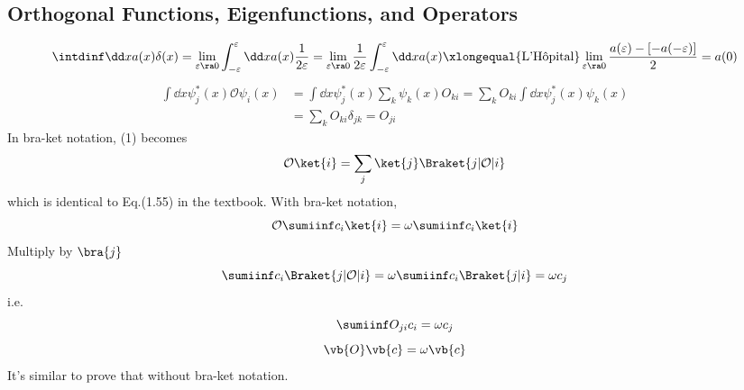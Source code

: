 \documentclass[a4paper]{article}
\begin{document}
\subsection{Orthogonal Functions, Eigenfunctions, and Operators}
\begin{equation}\label{key}
\intdinf \dd x a(x)\delta(x) = \lim_{\varepsilon\ra 0} \int_{-\varepsilon}^\varepsilon \dd x a(x)\dfrac{1}{2\varepsilon} = \lim_{\varepsilon\ra 0} \dfrac{1}{2\varepsilon} \int_{-\varepsilon}^\varepsilon \dd x a(x) 
\xlongequal{\text{L'H\^opital}} \lim_{\varepsilon\ra 0} \dfrac{a(\varepsilon) - [-a(-\varepsilon)]}{2} = a(0)
\end{equation}
\begin{equation}\label{key}
\begin{aligned}
\int \dd x \psi_j^*(x)\mathcal{O}\psi_i(x) &= \int\dd x \psi_j^*(x)\sum_k\psi_k(x)O_{ki} = \sum_k O_{ki}\int\dd x \psi_j^*(x)\psi_k(x)\\
&= \sum_k O_{ki}\delta_{jk} =  O_{ji}
\end{aligned}
\end{equation}
In bra-ket notation, (1) becomes
\begin{equation}\label{key}
\mathcal{O}\ket{i} = \sum_j \ket{j} \Braket{j | \mathcal{O} | i}
\end{equation}
which is identical to Eq.(1.55) in the textbook.
With bra-ket notation,
\begin{equation}\label{key}
\mathcal{O}\sumiinf c_i\ket{i} = \omega\sumiinf c_i\ket{i}
\end{equation}
Multiply by $ \bra{j} $
\begin{equation}\label{key}
\sumiinf c_i \Braket{j | \mathcal{O} | i} = \omega\sumiinf c_i \Braket{j | i} = \omega c_j
\end{equation}
i.e.
\begin{equation}\label{key}
\sumiinf O_{ji} c_i = \omega c_j
\end{equation}
\begin{equation}\label{key}
\vb{O}\vb{c} = \omega\vb{c}
\end{equation}
It's similar to prove that without bra-ket notation.
\end{document}
